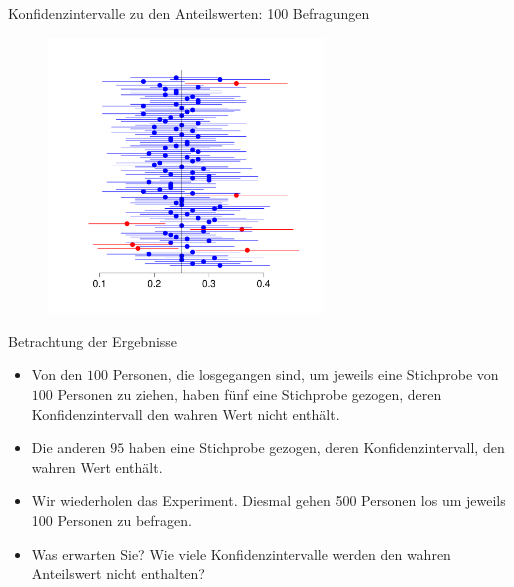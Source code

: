 \documentclass[usenames,dvipsnames,handout]{beamer}
\begin{document}
\begin{frame}{Konfidenzintervalle zu den Anteilswerten: 100 Befragungen}
  \begin{figure}[ht]
 	\centering
 	      \includegraphics[width=0.65\textwidth]{confi.pdf}%
 	\end{figure}
\end{frame}

\begin{frame}{Betrachtung der Ergebnisse}
\begin{itemize}
\item{Von den $100$ Personen, die losgegangen sind, um jeweils eine Stichprobe von  $100$ Personen
zu ziehen, haben fünf eine Stichprobe gezogen, deren Konfidenzintervall den wahren Wert nicht
enthält.
}\pause
\item{Die anderen $95$ haben eine Stichprobe gezogen, deren Konfidenzintervall, den wahren Wert enthält.}\pause
\item{Wir wiederholen das Experiment. Diesmal gehen 500 Personen los um jeweils 100 Personen zu befragen.}\pause
\item{Was erwarten Sie? Wie viele Konfidenzintervalle werden den wahren Anteilswert nicht enthalten?}
\end{itemize}
\end{frame}
\end{document}
